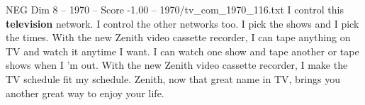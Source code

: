 \begin{textsample}{NEG Dim 8 – 1970 – Score -1.00 – 1970/tv\_com\_1970\_116.txt}  \label{ex:f8_neg_004}
I control this \textbf{television} network.
I control the other networks too.
I pick the shows and I pick the times.
With the new Zenith video cassette recorder, I can tape anything on TV and watch it anytime I want.
I can watch one show and tape another or tape shows when I 'm out.
With the new Zenith video cassette recorder, I make the TV schedule fit my schedule.
Zenith, now that great name in TV, brings you another great way to enjoy your life.

\end{textsample}
